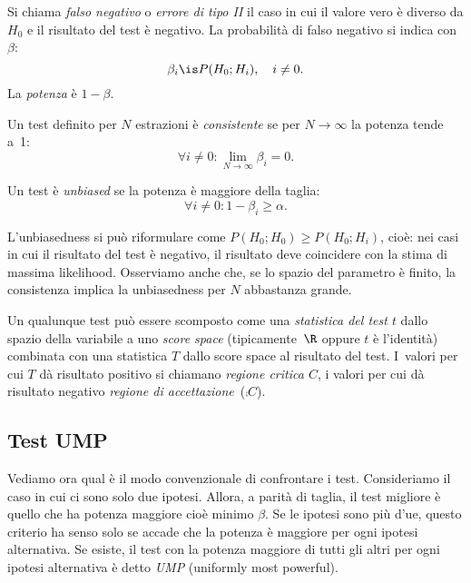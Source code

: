 \begin{definition}
	Si chiama \emph{falso negativo} o \emph{errore di tipo II}
	il caso in cui il valore vero è diverso da $H_0$ e il risultato del test è negativo.
	La probabilità di falso negativo si indica con $\beta$:
	\begin{equation*}
		\beta_i
		\is P(H_0;H_i), \quad i \neq 0.
	\end{equation*}
	La \emph{potenza} è $1-\beta$.
\end{definition}

\begin{definition}[Consistenza]
	Un test definito per $N$ estrazioni è \emph{consistente}
	se per $N\to\infty$ la potenza tende a~1:
	\begin{equation*}
		\forall i\neq0:
		\lim_{N\to\infty} \beta_i = 0.
	\end{equation*}
\end{definition}

\begin{definition}[Unbiasedness]
	Un test è \emph{unbiased}
	se la potenza è maggiore della taglia:
	\begin{equation*}
		\forall i\neq0:
		1-\beta_i \ge \alpha.
	\end{equation*}
\end{definition}

L'unbiasedness si può riformulare come $P(H_0;H_0)\ge P(H_0;H_i)$,
cioè: nei casi in cui il risultato del test è negativo,
il risultato deve coincidere con la stima di massima likelihood.
Osserviamo anche che,
se lo spazio del parametro è finito,
la consistenza implica la unbiasedness per $N$ abbastanza grande.

\begin{definition}	
	Un qualunque test può essere scomposto come una \emph{statistica del test $t$}
	dallo spazio della variabile a uno \emph{score space} (tipicamente~$\R$ oppure $t$ è l'identità)
	combinata con una statistica $T$ dallo score space al risultato del test.
	I~valori per cui $T$ dà risultato positivo si chiamano \emph{regione critica $C$},
	i valori per cui dà risultato negativo \emph{regione di accettazione}~($\comp C$).
\end{definition}

\subsection{Test UMP}

Vediamo ora qual è il modo convenzionale di confrontare i test.
Consideriamo il caso in cui ci sono solo due ipotesi.
Allora, a parità di taglia,
il test migliore è quello che ha potenza maggiore cioè minimo $\beta$.
Se le ipotesi sono più d'ue,
questo criterio ha senso solo se accade che la potenza è maggiore per ogni ipotesi alternativa.
Se esiste, il test con la potenza maggiore di tutti gli altri per ogni ipotesi alternativa è detto
\emph{UMP} (uniformly most powerful).

